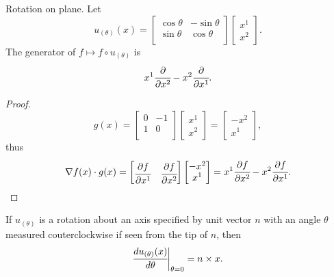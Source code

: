 \documentclass[main.tex]{subfiles}
\begin{document}
\begin{example}
Rotation on plane.
Let
\begin{equation}
u_{(\theta)}(x) = 
\begin{bmatrix}
\cos\theta & -\sin\theta \\
\sin\theta & \cos\theta \\
\end{bmatrix}
\begin{bmatrix}
x^1 \\
x^2
\end{bmatrix}.
\end{equation}
The generator of $f \mapsto f\circ u_{(\theta)}$ is 
\begin{equation}
x^1\cfrac{\partial}{\partial x^2} - x^2 \cfrac{\partial}{\partial x^1}.
\end{equation}
\end{example}
\begin{proof}
\begin{equation}
g(x) = \begin{bmatrix}
0 & -1 \\
1 & 0 \\
\end{bmatrix}
\begin{bmatrix}
x^1 \\
x^2
\end{bmatrix}
= 
\begin{bmatrix}
-x^2 \\
x^1
\end{bmatrix},
\end{equation}
thus
\begin{equation}
\nabla f(x) \cdot g(x) = 
\begin{bmatrix}
\cfrac{\partial f}{\partial x^1} & \cfrac{\partial f}{\partial x^2}
\end{bmatrix}
\begin{bmatrix}
-x^2 \\
x^1
\end{bmatrix}
= x^1 \cfrac{\partial f}{\partial x^2} - x^2 \cfrac{\partial f}{\partial x^1}.
\end{equation}
\end{proof}
\begin{proposition}
If $u_{(\theta)}$ is a rotation about an axis specified by unit vector $n$ with an angle $\theta$ measured couterclockwise if seen from the tip of $n$, then
\begin{equation}
\cfrac{du_{(\theta)}(x)}{d\theta}\bigg\vert_{\theta=0}=n\times x.
\end{equation} 
\end{proposition}
\end{document}
